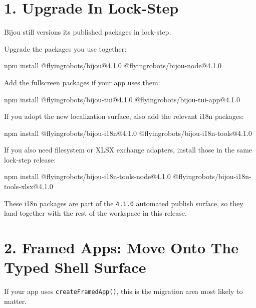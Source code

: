 \section{1. Upgrade In Lock-Step}\label{record-264-upgrade-in-lock-step}

Bijou still versions its published packages in lock-step.

Upgrade the packages you use together:

\begin{CodeBlock}
npm install @flyingrobots/bijou@4.1.0 @flyingrobots/bijou-node@4.1.0
\end{CodeBlock}

Add the fullscreen packages if your app uses them:

\begin{CodeBlock}
npm install @flyingrobots/bijou-tui@4.1.0 @flyingrobots/bijou-tui-app@4.1.0
\end{CodeBlock}

If you adopt the new localization surface, also add the relevant i18n packages:

\begin{CodeBlock}
npm install @flyingrobots/bijou-i18n@4.1.0 @flyingrobots/bijou-i18n-tools@4.1.0
\end{CodeBlock}

If you also need filesystem or XLSX exchange adapters, install those in the same lock-step release:

\begin{CodeBlock}
npm install @flyingrobots/bijou-i18n-tools-node@4.1.0 @flyingrobots/bijou-i18n-tools-xlsx@4.1.0
\end{CodeBlock}

These i18n packages are part of the \texttt{4\allowbreak{}.\allowbreak{}1\allowbreak{}.\allowbreak{}0} automated publish surface, so they land together with the rest of the workspace in this release.

\section{2. Framed Apps: Move Onto The Typed Shell Surface}\label{record-264-framed-apps-move-onto-the-typed-shell-surface}

If your app uses \texttt{c\allowbreak{}r\allowbreak{}e\allowbreak{}a\allowbreak{}t\allowbreak{}e\allowbreak{}F\allowbreak{}r\allowbreak{}a\allowbreak{}m\allowbreak{}e\allowbreak{}d\allowbreak{}A\allowbreak{}p\allowbreak{}p\allowbreak{}(\allowbreak{})}, this is the migration area most likely to matter.

